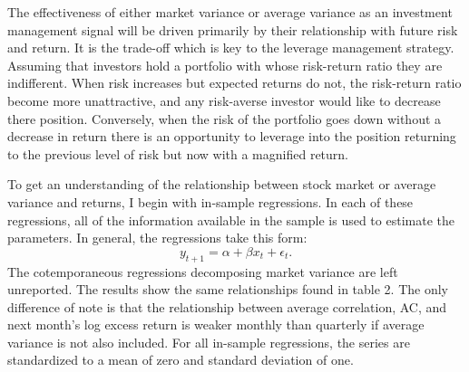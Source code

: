 The effectiveness of either market variance or average variance as an investment management signal will be driven primarily by their relationship with future risk and return. It is the trade-off which is key to the leverage management strategy. Assuming that investors hold a portfolio with whose risk-return ratio they are indifferent. When risk increases but expected returns do not, the risk-return ratio become more unattractive, and any risk-averse investor would like to decrease there position. Conversely, when the risk of the portfolio goes down without a decrease in return there is an opportunity to leverage into the position returning to the previous level of risk but now with a magnified return.

To get an understanding of the relationship between stock market or average variance and returns, I begin with in-sample regressions. In each of these regressions, all of the information available in the sample is used to estimate the parameters. In general, the regressions take this form: 
\begin{equation}
	y_{t+1} = \alpha + \beta x_{t} + \epsilon_{t}.
\end{equation}
The cotemporaneous regressions decomposing market variance are left unreported. The results show the same relationships found in  \citet{pollet_average_2010} table 2. The only difference of note is that the relationship between average correlation, AC, and next month’s log excess return is weaker monthly than quarterly if average variance is not also included. For all in-sample regressions, the series are standardized to a mean of zero and standard deviation of one.
